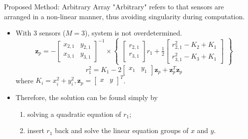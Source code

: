 \documentclass[10pt]{beamer}
\begin{document}
\begin{frame}{Proposed Method: Arbitrary Array}
  "Arbitrary" refers to that sensors are arranged in a non-linear manner,
  thus avoiding singularity during computation.
  \begin{itemize}
    \item With \alert{3} sensors ($M = 3$), system is not overdetermined.
            $$\mathbf{z}_p = - \begin{bmatrix}x_{2,1}&y_{2,1} \\ x_{3,1}&y_{3,1}\end{bmatrix}^{-1} \times
              \begin{Bmatrix} \begin{bmatrix}r_{2,1}\\r_{3,1}\end{bmatrix}r_1 + \frac{1}{2}
                              \begin{bmatrix}r_{2,1}^2-K_2+K_1 \\ r_{3,1}^2-K_3+K_1 \end{bmatrix}\end{Bmatrix}$$
            $$r_1^2 = K_1-
              2\begin{bmatrix}x_1&y_1\end{bmatrix} \mathbf{z}_p+
              \mathbf{z}_p^T \mathbf{z}_p$$
          where $K_i = x_i^2 + y_i^2, \mathbf{z}_p = \begin{bmatrix}x&y\end{bmatrix}^T$.
    \item Therefore, the solution can be found simply by
    \begin{enumerate}
      \item solving a quadratic equation of $r_1$;
      \item insert $r_1$ back and solve the linear equation groups of $x$ and $y$.
    \end{enumerate}
  \end{itemize}
\end{frame}
\end{document}
